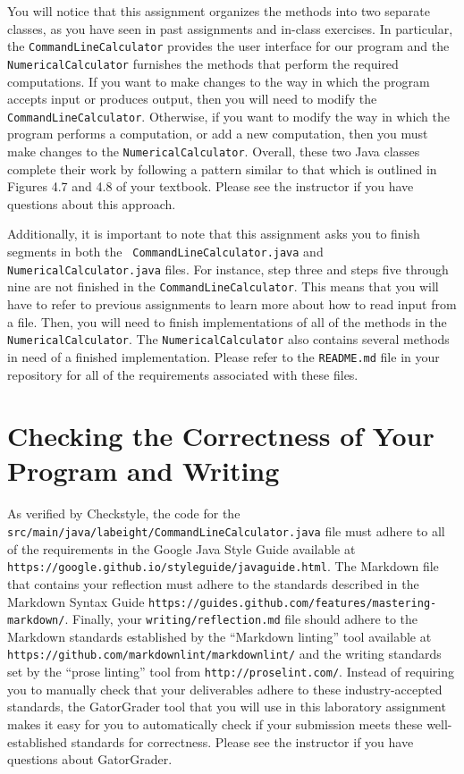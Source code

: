\documentclass[11pt]{article}
\newcommand{\mainprogram}{\lstinline{CommandLineCalculator}}
\newcommand{\mainprogramsource}{\lstinline{src/main/java/labeight/CommandLineCalculator.java}}
\newcommand{\secondprogram}{\lstinline{NumericalCalculator}}
\newcommand{\reflection}{\lstinline{writing/reflection.md}}
\newcommand{\readme}{\lstinline{README.md}}
\newcommand{\url}[1]{\lstinline{#1}}
\newcommand{\step}[1]{``{#1}''}
\begin{document}
You will notice that this assignment organizes the methods into two separate classes, as you have seen in past
assignments and in-class exercises. In particular, the {\tt CommandLineCalculator} provides the user interface for our
program and the {\tt NumericalCalculator} furnishes the methods that perform the required computations. If you want to
make changes to the way in which the program accepts input or produces output, then you will need to modify the {\tt
CommandLineCalculator}. Otherwise, if you want to modify the way in which the program performs a computation, or add a
new computation, then you must make changes to the {\tt NumericalCalculator}. Overall, these two Java classes complete
their work by following a pattern similar to that which is outlined in Figures 4.7 and 4.8 of your textbook. Please see
the instructor if you have questions about this approach.

Additionally, it is important to note that this assignment asks you to finish segments in both the {\tt
CommandLineCalculator.java} and {\tt NumericalCalculator.java} files. For instance, step three and steps five through
nine are not finished in the \mainprogram{}. This means that you will have to refer to previous assignments to learn
more about how to read input from a file. Then, you will need to finish implementations of all of the methods in the
\secondprogram{}. The \secondprogram{} also contains several methods in need of a finished implementation. Please refer
to the \readme{} file in your repository for all of the requirements associated with these files.

\section*{Checking the Correctness of Your Program and Writing}

As verified by Checkstyle, the code for the \mainprogramsource{} file must adhere to all of the requirements in the
Google Java Style Guide available at \url{https://google.github.io/styleguide/javaguide.html}. The Markdown file that
contains your reflection must adhere to the standards described in the Markdown Syntax Guide
\url{https://guides.github.com/features/mastering-markdown/}. Finally, your \reflection{} file should adhere to the
Markdown standards established by the \step{Markdown linting} tool available at
\url{https://github.com/markdownlint/markdownlint/} and the writing standards set by the \step{prose linting} tool from
\url{http://proselint.com/}. Instead of requiring you to manually check that your deliverables adhere to these
industry-accepted standards, the GatorGrader tool that you will use in this laboratory assignment makes it easy for you
to automatically check if your submission meets these well-established standards for correctness. Please see the
instructor if you have questions about GatorGrader.
\end{document}
